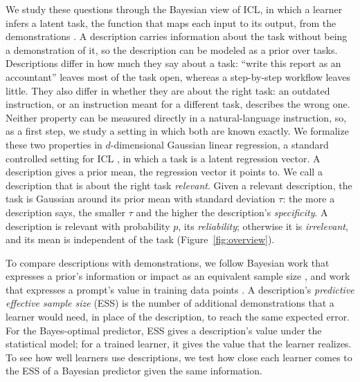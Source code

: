 We study these questions through the Bayesian view of ICL, in which a learner infers a latent task, the function that maps each input to its output, from the demonstrations \citep{xie2022}. A description carries information about the task without being a demonstration of it, so the description can be modeled as a prior over tasks. Descriptions differ in how much they say about a task: ``write this report as an accountant'' leaves most of the task open, whereas a step-by-step workflow leaves little. They also differ in whether they are about the right task: an outdated instruction, or an instruction meant for a different task, describes the wrong one. Neither property can be measured directly in a natural-language instruction, so, as a first step, we study a setting in which both are known exactly. We formalize these two properties in $d$-dimensional Gaussian linear regression, a standard controlled setting for ICL \citep{garg2022,panwar2024}, in which a task is a latent regression vector. A description gives a prior mean, the regression vector it points to. We call a description that is about the right task \emph{relevant}. Given a relevant description, the task is Gaussian around its prior mean with standard deviation $\tau$: the more a description says, the smaller $\tau$ and the higher the description's \emph{specificity}. A description is relevant with probability $p$, its \emph{reliability}; otherwise it is \emph{irrelevant}, and its mean is independent of the task (Figure~\ref{fig:overview}).

To compare descriptions with demonstrations, we follow Bayesian work that expresses a prior's information or impact as an equivalent sample size \citep{wiesenfarth2020,reimherr2021,selby2025}, and work that expresses a prompt's value in training data points \citep{lescao2021}. A description's \emph{predictive effective sample size} (ESS) is the number of additional demonstrations that a learner would need, in place of the description, to reach the same expected error. For the Bayes-optimal predictor, ESS gives a description's value under the statistical model; for a trained learner, it gives the value that the learner realizes. To see how well learners use descriptions, we test how close each learner comes to the ESS of a Bayesian predictor given the same information.


